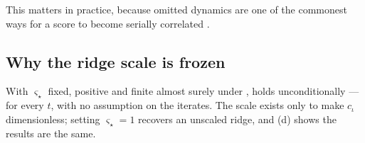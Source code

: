 This matters in practice, because omitted dynamics are one of the commonest ways for a score to become
serially correlated \citep{white1982mle,domowitz1982misspecified}.

\subsection{Why the ridge scale is frozen}
\label{app:freeze}

With $\varsigma_\star$ fixed, positive and finite almost surely under , 
holds unconditionally --- for every $t$, with no assumption on the iterates. The scale exists only to make
$c_\iota$ dimensionless; setting $\varsigma_\star=1$ recovers an unscaled ridge, and
(d) shows the results are the same.
